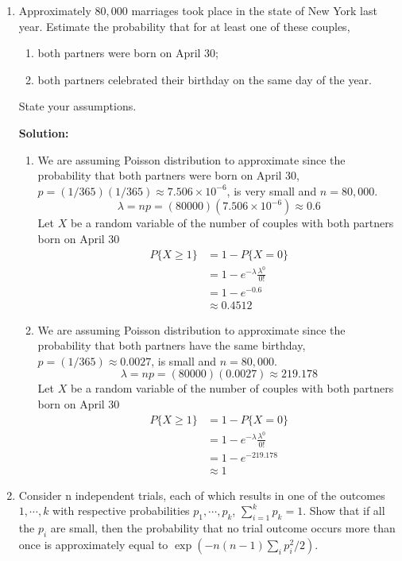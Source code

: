 \documentclass{report}
\begin{document}
\begin{enumerate}

\item Approximately $80,000$ marriages took place in the
state of New York last year. Estimate the probability that
for at least one of these couples,
\begin{enumerate}
	\item both partners were born on April 30;
	\item both partners celebrated their birthday on the same
	day of the year.
\end{enumerate}
State your assumptions.

{\bf Solution:}
\begin{enumerate}
    \item We are assuming Poisson distribution to approximate since the probability that both partners were born on April 30, $p=(1/365)(1/365)\approx 7.506\times 10^{-6}$, is very small and $n=80,000$.
    $$ \lambda = np = (80000) (7.506\times10^{-6})\approx 0.6$$
    Let $X$ be a random variable of the number of couples with both partners born on April 30
    \begin{align*}
        P\{ X\geq 1\} &= 1-P\{ X=0\} \\
        &=1-e^{-\lambda} \frac{\lambda^0}{0!}\\
        &=1-e^{-0.6} \\
        &\approx0.4512 
    \end{align*}
   \item We are assuming Poisson distribution to approximate since the probability that both partners have the same birthday, $p=(1/365)\approx 0.0027$, is small and $n=80,000$.
   $$ \lambda = np = (80000)(0.0027)\approx 219.178$$
    Let $X$ be a random variable of the number of couples with both partners born on April 30
    \begin{align*}
        P\{ X\geq 1\} &= 1-P\{ X=0\} \\
        &=1-e^{-\lambda} \frac{\lambda^0}{0!}\\
        &=1-e^{-219.178} \\
        &\approx 1
    \end{align*}
    
\end{enumerate}


\item Consider n independent trials, each of which results
in one of the outcomes $1, \cdots, k$ with respective probabilities
$p_1,\cdots, p_k$, 
$\sum_{i=1}^{k}p_k=1$. Show that if all the $p_i$ are
small, then the probability that no trial outcome occurs
more than once is approximately equal to $\exp(-n(n-1)\sum_i p_i^2/2)$. 


\end{enumerate}
\end{document}
